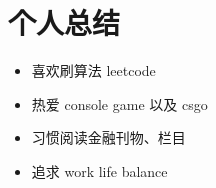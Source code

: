 \documentclass{resume}
\begin{document}

\section{个人总结}
\begin{itemize}[parsep=0.2ex]
  \item 喜欢刷算法 leetcode
  \item 热爱 console game 以及 csgo
  \item 习惯阅读金融刊物、栏目
  \item 追求 work life balance
\end{itemize}

%
%
\end{document}
